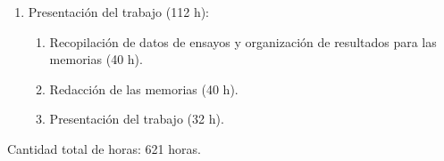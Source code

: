 \begin{enumerate}
\item Presentación del trabajo (112 h):

  \begin{enumerate}
  \item Recopilación de datos de ensayos y organización de resultados para las
    memorias (40 h).
  \item Redacción de las memorias (40 h).
  \item Presentación del trabajo (32 h).
  \end{enumerate}
\end{enumerate}

Cantidad total de horas: 621 horas.
